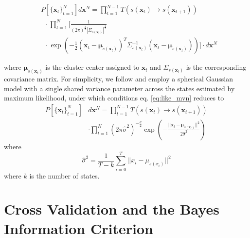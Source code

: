 \documentclass[twocolumn,floatfix,nofootinbib,aps]{revtex4-1}
\begin{document}
\begin{equation}
\label{eq:like_mvn}
\begin{split}
&P\left[\{\mathbf{x}_t\}_{t=1}^N\right] d\mathbf{x}^N = \prod_{t=1}^{N-1} T(s(\mathbf{x}_t) \rightarrow s(\mathbf{x}_{t+1})) \\
	&\;\;\cdot \prod_{t=1}^N\Bigg[ \frac{1}{(2 \pi)^\frac{d}{2} |\Sigma_{s(\mathbf{x}_t)}|^\frac{1}{2}} \\
    &\;\;\cdot \exp\left(-\frac{1}{2} (\mathbf{x}_t - \bm{\mu}_{s(\mathbf{x}_t)})^T \Sigma_{s(\mathbf{x}_t)}^{-1} (\mathbf{x}_t - \bm{\mu}_{s(\mathbf{x}_t)})\right)\Bigg] \cdot d\mathbf{x}^N
\end{split}
\end{equation}

where $\bm{\mu}_{s(\mathbf{x}_t)}$ is the cluster center assigned to $\mathbf{x}_t$ and $\Sigma_{s(\mathbf{x}_t)}$ is the corresponding covariance matrix. For simplicity, we follow \citet{Pelleg2000Xmeans} and employ a spherical Gaussian model with a single shared variance parameter across the states estimated by maximum likelihood, under which conditions eq. \ref{eq:like_mvn} reduces to
\begin{equation}
\label{eq:like_mvn2}
\begin{split}
P\left[\{\mathbf{x}_t\}_{t=1}^{N}\right] & d\mathbf{x}^N = \prod_{t=1}^{N-1} T(s(\mathbf{x}_t) \rightarrow s(\mathbf{x}_{t+1})) \\
	&\cdot \prod_{t=1}^N \left(2 \pi \hat{\sigma}^2\right)^{-\frac{d}{2}} \exp\left(-\frac{||\mathbf{x}_t - \bm{\mu}_{s(\mathbf{x}_t)}||^2}{2 \hat{\sigma}^2}\right)
\end{split}
\end{equation} where
\begin{equation}
\label{eq:mle_sigma}
\hat{\sigma}^2 = \frac{1}{T - k} \sum_{i=0}^T || x_i - \mu_{s(x_i)} ||^2
\end{equation} where $k$ is the number of states.

\section{Cross Validation and the Bayes Information Criterion}

\end{document}
